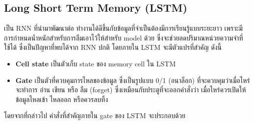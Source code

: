 \subsection{Long Short Term Memory (LSTM)}
\label{subsec:lstm}
เป็น RNN ที่นำมาพัฒนาต่อ ทำงานได้ดีขึ้นกับข้อมูลที่จำเป็นต้องมีการเรียนรู้แบบระยะยาว เพราะมีการกำหนดน้ำหนักสำหรับการลืมเอาไว้ให้สำหรับ model ด้วย ซึ่งจะช่วยลดปริมาณหน่วยความจำที่ใช้ได้ ซึ่งเป็นปัญหาที่พบได้จาก RNN ปกติ โดยภายใน LSTM จะมีตัวแปรที่สำคัญ ดังนี้
\begin{itemize}
      \item \textbf{Cell state} เป็นตัวเก็บ state ของ memory cell ใน LSTM
      \item \textbf{Gate} เป็นตัวที่ควบคุมการไหลของข้อมูล ซึ่งเป็นรูปแบบ 0/1 (อนาล็อก) ที่จะควบคุมว่าเมื่อไหร่จะทำการ อ่าน เขียน หรือ ลืม (forget) ซึ่งเหมือนกับประตูที่จะออกคำสั่งว่า เมื่อไหร่ควรเปิดให้ข้อมูลไหลเข้า ไหลออก หรือควรลบทิ้ง
\end{itemize}
โดยจากที่กล่าวไป คำสั่งที่สำคัญภายใน gate ของ LSTM จะประกอบด้วย
